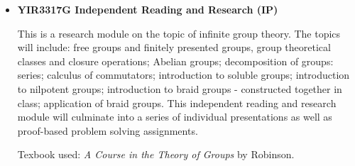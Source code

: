 \documentclass[11pt,reqno,oneside,a4paper]{article}
\begin{document}
\begin{itemize}
		\item \textbf{YIR3317G Independent Reading and Research (IP)}
		
		\par This is a research module on the topic of infinite group theory. The topics will include: free groups and finitely presented groups, group theoretical classes and closure operations; Abelian groups; decomposition of groups: series; calculus of commutators; introduction to soluble groups; introduction to nilpotent groups; introduction to braid groups - constructed together in class; application of braid groups. This independent reading and research module will culminate into a series of individual presentations as well as proof-based problem solving assignments. 
		
		\par Texbook used: \textit{A Course in the Theory of Groups} by Robinson.
	\end{itemize}
\end{document}
